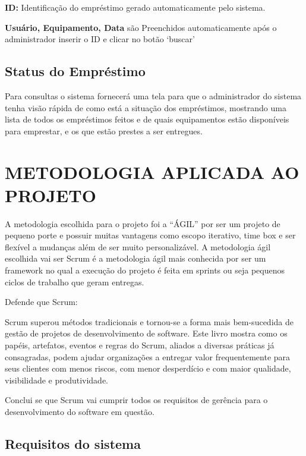 \documentclass[
12pt,				%
oneside,			%
a4paper,			%
section=TITLE,
brazil,				%
]{abntex2}
\let\oldsection\section
\renewcommand\section{\clearpage\oldsection}
\begin{document}
  \textbf{ID:} Identificação do empréstimo gerado automaticamente pelo sistema.

  \textbf{Usuário, Equipamento, Data}  são Preenchidos automaticamente após o
  administrador inserir o ID e clicar no botão `buscar'

  \subsection{Status do Empréstimo}

  Para consultas o sistema fornecerá uma tela para que o administrador do sistema
  tenha visão rápida de como está a situação dos empréstimos, mostrando uma lista
  de todos os empréstimos feitos e de quais equipamentos estão disponíveis para
  emprestar, e os que estão prestes a ser entregues.

  \section{METODOLOGIA APLICADA AO PROJETO}

  A metodologia escolhida para o projeto foi a “ÁGIL” por ser um projeto de
  pequeno porte e possuir muitas vantagens como escopo iterativo, time box e ser
  flexível a mudanças além de ser muito personalizável.  A metodologia ágil
  escolhida vai ser Scrum é a metodologia ágil mais conhecida por ser um
  framework no qual a execução do projeto é feita em sprints ou seja pequenos
  ciclos de trabalho que geram entregas.

  \cite[p.8]{sabbagh2014scrum}Defende que Scrum:

  \begin{citacao}

    Scrum superou métodos tradicionais e tornou-se a forma mais bem-sucedida de
    gestão de projetos de desenvolvimento de software. Este livro mostra como os
    papéis, artefatos, eventos e regras do Scrum, aliados a diversas práticas já
    consagradas, podem ajudar organizações a entregar valor frequentemente para
    seus clientes com menos riscos, com menor desperdício e com maior qualidade,
    visibilidade e produtividade.\cite[p,8]{sabbagh2014scrum}

  \end{citacao}

  Conclui se que Scrum vai cumprir todos os requisitos de gerência para o
  desenvolvimento do software em questão.

  \subsection{Requisitos do sistema}
\end{document}
